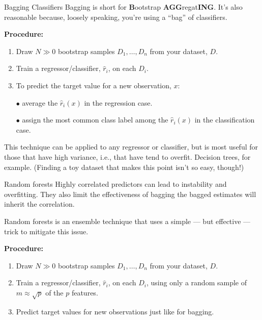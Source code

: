 \documentclass{beamer}
\begin{document}
\begin{frame}{Bagging Classifiers}
    Bagging is short for \textbf{B}ootstrap \textbf{AGG}regat\textbf{ING}.
    It's also reasonable because, loosely speaking, you're using a ``bag'' of classifiers.

    \textbf{Procedure:}
    \begin{enumerate}
        \item Draw $N\gg 0$ bootstrap samples $D_1,\ldots,D_n$ from your dataset, $D$.
        \item Train a regressor/classifier, $\hat r_i$, on each $D_i$.
        \item To predict the target value for a new observation, $x$:

        $\bullet$ average the $\hat r_i(x)$ in the regression case.
        
        $\bullet$ assign the most common class label among the $\hat r_i(x)$ in the classification case.            
    \end{enumerate}

    This technique can be applied to any regressor or classifier, but is most useful for those that have high variance, i.e., that have tend to overfit. Decision trees, for example.
    (Finding a toy dataset that makes this point isn't so easy, though!)
\end{frame}

\begin{frame}{Random forests}
    Highly correlated predictors can lead to instability and overfitting. They also limit the effectiveness of bagging the bagged estimates will inherit the correlation.

    Random forests is an ensemble technique that uses a simple --- but effective --- trick to mitigate this issue.

    \textbf{Procedure:}
    \begin{enumerate}
        \item Draw $N\gg 0$ bootstrap samples $D_1,\ldots,D_n$ from your dataset, $D$.
        \item Train a regressor/classifier, $\hat r_i$, on each $D_i$, using only a random sample of $m\approx \sqrt p$ of the $p$ features.
        \item Predict target values for new observations just like for bagging.
    \end{enumerate}

 
\end{frame}
\end{document}
